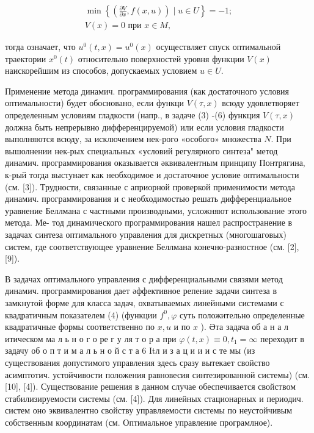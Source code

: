 \documentclass[10pt]{article}
\begin{document}
\[
\begin{gathered}
\min \left\{\left(\frac{\partial V}{\partial x}, f(x, u)\right) \mid u \in U\right\}=-1 ; \\
V(x)=0 \text { при } x \in M,
\end{gathered}
\]

тогда означает, что $u^{0}(t, x)=u^{0}(x)$ осуществляет спуск оптимальной траектории $x^{0}(t)$ относительно поверхностей уровня функции $V(x)$ наискорейшим из способов, допускаемых условием $u \in U$.

Применение метода динамич. программирования (как достаточного условия оптимальности) будет обосновано, если функци $V(\tau, x)$ всюду удовлетворяет определенным условиям гладкости (напр., в задаче (3) -(6) функция $V(\tau, x)$ должна быть непрерывно дифференцируемой) или если условия гладкости выполняются всюду, за исключением нек-рого «особого» множества $N$. При вышолнении нек-рых специальных «условий регулярного синтеза" метод динамич. программирования оказывается әквивалентным принципу Понтрягина, к-рый тогда выстунает как необходимое и достаточное условие оптимальности (см. [3]). Трудности, связанные с априорной проверкой применимости метода динамич. программирования и с необходимостью решать дифференциальное уравнение Беллмана с частными производными, усложняют использование этого метода. Ме- тод динамического программирования нашел распространение в задачах синтеза оптимального управления для дискретных (многошаговых) систем, где соответствующее уравнение Беллмана конечно-разностное (см. [2], [9]).

В задачах оптимального управления с дифференциальными связями метод динамич. программирования дает әффективное репение задачи синтеза в замкнутой форме для класса задач, охватываемых линейными системами с квадратичным показателем (4) (функции $f^{0}, \varphi$ суть положительно определенные квадратичные формы соответственно по $x, u$ и по $x$ ). Әта задача об а н а л итическом ма л ь н о г о ре г у ля т о р а при $\varphi(t, x) \equiv 0, t_{1}=\infty$ переходит в задачу об о п т и м а л ь н о й с т а 6 Itл и з а ц и и и с те мы (из существования допустимого управления здесь сразу вытекает свойство асимптотич. устойчивости положения равновесия синтезированной системы) (см. [10], [4]). Существование решения в данном случае обеспечивается свойством стабилизируемости системы (см. [4]). Для линейных стационарных и периодич. систем оно эквивалентно свойству управляемости системы по неустойчивым собственным координатам (см. Оптимальное управление програмлное).
\end{document}
